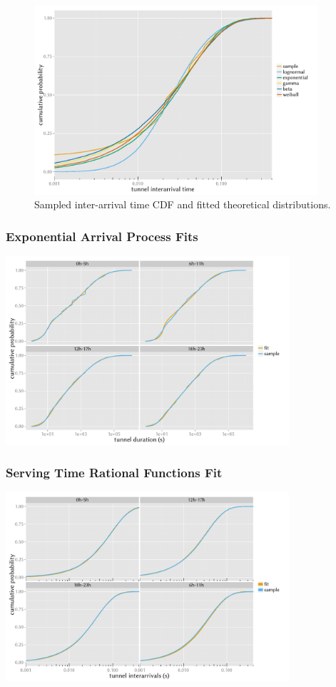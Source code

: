 \documentclass{beamer}
\begin{document}
\begin{frame}
	\begin{figure}[htb]
		\centering
		\includegraphics[height=7cm]{../../chapters/041-mobilenetsmeasuring/images/R-IAT-ecdfs.pdf}
		\caption{Sampled inter-arrival time CDF and fitted theoretical distributions.}
	\end{figure}
\end{frame}

\begin{frame}
	\frametitle{Exponential Arrival Process Fits}

	\begin{center}
		\includegraphics[height=7cm]{../../chapters/041-mobilenetsmeasuring/images/R-duration-fit-cdf-facets.pdf}
	\end{center}
\end{frame}

\begin{frame}
	\frametitle{Serving Time Rational Functions Fit}

	\begin{center}
		\includegraphics[height=7cm]{../../chapters/041-mobilenetsmeasuring/images/R-IAT-active-fit-cdf-facets.pdf}
	\end{center}
\end{frame}
\end{document}
